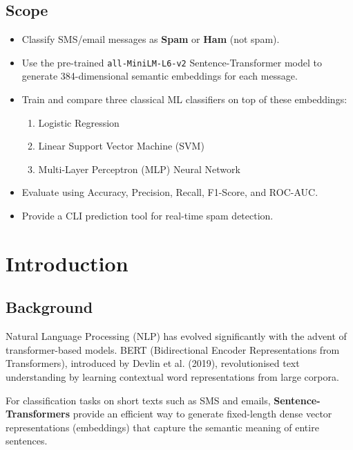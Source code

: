 \documentclass[12pt,a4paper]{article}
\begin{document}
\subsection{Scope}
\begin{itemize}[leftmargin=1.5cm]
    \item Classify SMS/email messages as \textbf{Spam} or \textbf{Ham} (not spam).
    \item Use the pre-trained \texttt{all-MiniLM-L6-v2} Sentence-Transformer model to generate 384-dimensional semantic embeddings for each message.
    \item Train and compare three classical ML classifiers on top of these embeddings:
    \begin{enumerate}
        \item Logistic Regression
        \item Linear Support Vector Machine (SVM)
        \item Multi-Layer Perceptron (MLP) Neural Network
    \end{enumerate}
    \item Evaluate using Accuracy, Precision, Recall, F1-Score, and ROC-AUC.
    \item Provide a CLI prediction tool for real-time spam detection.
\end{itemize}

\section{Introduction}

\subsection{Background}
Natural Language Processing (NLP) has evolved significantly with the advent of transformer-based models. BERT (Bidirectional Encoder Representations from Transformers), introduced by Devlin et al. (2019), revolutionised text understanding by learning contextual word representations from large corpora.

For classification tasks on short texts such as SMS and emails, \textbf{Sentence-Transformers} provide an efficient way to generate fixed-length dense vector representations (embeddings) that capture the semantic meaning of entire sentences.
\end{document}
